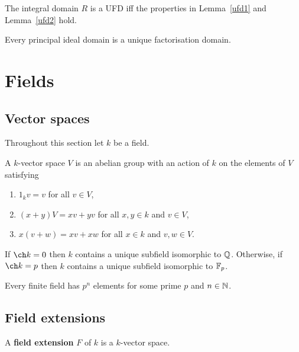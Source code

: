 \documentclass[../Year2.tex]{subfiles}
\begin{document}
\begin{theorem}
    The integral domain $R$ is a UFD iff the properties in Lemma~\ref{ufd1} and Lemma~\ref{ufd2} hold.
\end{theorem}

\begin{theorem}
    Every principal ideal domain is a unique factorisation domain.
\end{theorem}

\section{Fields}

\subsection{Vector spaces}
Throughout this section let $k$ be a field.

\begin{definition}
    A $k$-vector space $V$ is an abelian group with an action of $k$ on the elements of $V$ satisfying \begin{enumerate}
        \item $1_k v=v$ for all $v\in V$,
        \item $(x+y)V = xv + yv$ for all $x,y\in k$ and $v\in V$,
        \item $x(v+w) = xv + xw$ for all $x\in k$ and $v,w\in V$.
    \end{enumerate}
\end{definition}

\begin{proposition}
    If $\ch k=0$ then $k$ contains a unique subfield isomorphic to $\mathbb{Q}$. Otherwise, if $\ch k = p$ then $k$ contains a unique subfield isomorphic to $\mathbb{F}_p$.
\end{proposition}

\begin{theorem}
    Every finite field has $p^n$ elements for some prime $p$ and $n\in\mathbb{N}$.
\end{theorem}

\subsection{Field extensions}

\begin{definition}
    A \textbf{field extension} $F$ of $k$ is a $k$-vector space.
\end{definition}
\end{document}
